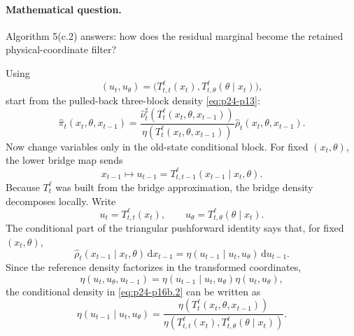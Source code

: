 \documentclass[11pt]{article}
\numberwithin{equation}{section}
\newcommand{\dd}{\,\mathrm d}
\begin{document}
\paragraph{Mathematical question.}
Algorithm 5(c.2) answers: how does the residual marginal become the retained
physical-coordinate filter?

Using
\begin{equation}
    (u_t,u_\theta)
    =
    \bigl(
    T_{t,t}^{\ell}(x_t),
    T_{t,\theta}^{\ell}(\theta\mid x_t)
    \bigr),
    \label{eq:p24-p16}
\end{equation}
start from the pulled-back three-block density \eqref{eq:p24-p13}:
\begin{equation}
    \widehat\pi_t(x_t,\theta,x_{t-1})
    =
    \frac{
    \widehat\nu_t^\sharp(T_t^\ell(x_t,\theta,x_{t-1}))}
    {\eta(T_t^\ell(x_t,\theta,x_{t-1}))}
    \widehat\rho_t(x_t,\theta,x_{t-1}).
    \label{eq:p24-p16a}
\end{equation}
Now change variables only in the old-state conditional block.  For fixed
\((x_t,\theta)\), the lower bridge map sends
\begin{equation}
    x_{t-1}
    \mapsto
    u_{t-1}
    =
    T_{t,t-1}^{\ell}(x_{t-1}\mid x_t,\theta).
    \label{eq:p24-p16b}
\end{equation}
Because \(T_t^\ell\) was built from the bridge approximation, the bridge
density decomposes locally.  Write
\begin{equation}
    u_t=T_{t,t}^{\ell}(x_t),\qquad
    u_\theta=T_{t,\theta}^{\ell}(\theta\mid x_t).
    \label{eq:p24-p16b.1}
\end{equation}
The conditional part of the triangular pushforward identity says that, for
fixed \((x_t,\theta)\),
\begin{equation}
    \widehat\rho_t(x_{t-1}\mid x_t,\theta)\dd x_{t-1}
    =
    \eta(u_{t-1}\mid u_t,u_\theta)\dd u_{t-1}.
    \label{eq:p24-p16b.2}
\end{equation}
Since the reference density factorizes in the transformed coordinates,
\begin{equation}
    \eta(u_t,u_\theta,u_{t-1})
    =
    \eta(u_{t-1}\mid u_t,u_\theta)\eta(u_t,u_\theta),
    \label{eq:p24-p16b.3}
\end{equation}
the conditional density in \eqref{eq:p24-p16b.2} can be written as
\begin{equation}
    \eta(u_{t-1}\mid u_t,u_\theta)
    =
    \frac{\eta(T_t^\ell(x_t,\theta,x_{t-1}))}
    {\eta(T_{t,t}^{\ell}(x_t),T_{t,\theta}^{\ell}(\theta\mid x_t))}.
    \label{eq:p24-p16b.4}
\end{equation}
\end{document}
